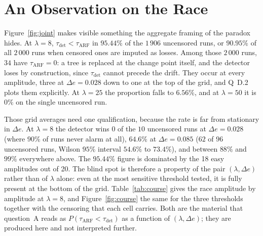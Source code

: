 \documentclass[11pt,a4paper]{article}
\begin{document}
\section{An Observation on the Race}

Figure~\ref{fig:joint} makes visible something the aggregate framing of the paradox hides.
At $\lambda = 8$, $\tau_{\mathrm{det}} < \tau_{\mathrm{ARF}}$ in $95.44\%$ of the $1\,906$
uncensored runs, or $90.95\%$ of all $2\,000$ runs when censored ones are imputed as
losses. Among those $2\,000$ runs, $34$ have $\tau_{\mathrm{ARF}} = 0$: a tree is replaced
at the change point itself, and the detector loses by construction, since
$\tau_{\mathrm{det}}$ cannot precede the drift. They occur at every amplitude, three at
$\Delta e = 0.028$ down to one at the top of the grid, and Q~D.2 plots them explicitly. At $\lambda = 25$ the proportion falls to $6.56\%$, and at $\lambda = 50$ it is
$0\%$ on the single uncensored run.

Those grid averages need one qualification, because the rate is far from stationary in
$\Delta e$. At $\lambda = 8$ the detector wins $0$ of the $10$ uncensored runs at
$\Delta e = 0.028$ (where $90\%$ of runs never alarm at all), $64.6\%$ at
$\Delta e = 0.085$ ($62$ of $96$ uncensored runs, Wilson $95\%$ interval $54.6\%$ to
$73.4\%$), and between $88\%$ and $99\%$ everywhere above. The $95.44\%$ figure is
dominated by the 18 easy amplitudes out of 20. The blind spot is therefore a property of
the pair $(\lambda, \Delta e)$ rather than of $\lambda$ alone: even at the most sensitive
threshold tested, it is fully present at the bottom of the grid.
Table~\ref{tab:course} gives the race amplitude by amplitude at $\lambda = 8$, and
Figure~\ref{fig:course} the same for the three thresholds together with the censoring that
each cell carries. Both are the material that question~A reads as
$P(\tau_{\mathrm{ARF}} < \tau_{\mathrm{det}})$ as a function of $(\lambda, \Delta e)$; they
are produced here and not interpreted further.
\end{document}
